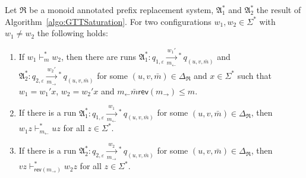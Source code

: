 \documentclass{LMCS}
\newcommand{\apathS}[2][]{\xrightarrow[#1]{#2}\!\!{}^*\,}
\newcommand{\eps}{\varepsilon}
\newcommand{\DeltaR}{\Delta_{\mathfrak R}}
\newcommand{\automatonA}{\mathfrak A}
\newcommand{\prsR}{\mathfrak R}
\newcommand{\configstepsCost}[2][*]{\vdash^{#1}_{#2}}
\newcommand{\rl}{m_{\leftarrow}}
\newcommand{\rr}{m_{\rightarrow}}
\newcommand{\rev}{\mathsf{rev}}
\begin{document}
\begin{lem}\label{lem:CorrectnessOfGTTSaturation}
  Let $\prsR$ be a monoid annotated prefix replacement system, $\automatonA^*_1$
and $\automatonA^*_2$ the result of Algorithm~\ref{algo:GTTSaturation}. For two
configurations $w_1,w_2 \in \Sigma^*$ with $w_1 \ne w_2$ the following holds:
  \begin{enumerate}[label=(\roman*)]
   \item If $w_1 \configstepsCost{m} w_2$, then there are runs $\automatonA^*_1:
q_{1,\eps} \apathS[\rl]{w_1'} q_{(u,v,\bar m)}$ and $\automatonA^*_2: q_{2,\eps}
\apathS[\rr]{w_2'} q_{(u,v,\bar m)}$ for some $(u,v,\bar m) \in \DeltaR$ and $x
\in \Sigma^*$ such that $w_1 = w_1'x$, $w_2 = w_2'x$  and $\rl \bar m \rev(\rr)
\le m$.
	\item If there is a run $\automatonA^*_1: q_{1,\eps} 
	\apathS[\rl]{w_1} q_{(u,v,\bar m)}$ for some $(u,v,\bar m) \in \DeltaR$, 
	then $w_1z \configstepsCost{\rl} uz$ for all $z \in \Sigma^*$.
	\item If there is a run $\automatonA^*_2: q_{2,\eps} 
	\apathS[\rr]{w_2} q_{(u,v,\bar m)}$ for some $(u,v,\bar m) \in \DeltaR$, 
	then $vz \configstepsCost{\rev(\rr)} w_2z$ for all $z \in \Sigma^*$.
  \end{enumerate}
\end{lem}
\end{document}
